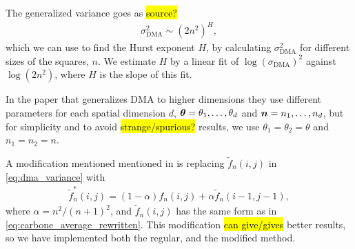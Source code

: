 The generalized variance goes as \hl{source?}
\begin{align*}
    \sigma_\text{DMA}^2 \sim \left(2n^2\right)^H,
\end{align*}
which we can use to find the Hurst exponent $H$, by calculating $\sigma_\text{DMA}^2$ for different sizes of the squares, $n$. We estimate $H$ by a linear fit of $\log \left(\sigma_\text{DMA}\right)^2$ against $\log \left(2n^2 \right)$, where $H$ is the slope of this fit.

In the paper that generalizes DMA to higher dimensions\cite{carbone2007algorithm} they use different parameters for each spatial dimension $d$, $\boldsymbol{\theta} = \theta_1, \dots, \theta_d$ and $\boldsymbol{n} = n_1, \dots, n_d$, but for simplicity and to avoid \hl{strange/spurious?} results, we use $\theta_1 = \theta_2 = \theta$ and $n_1 = n_2 = n$.

A modification mentioned mentioned in \cite{carbone2007algorithm} is replacing $\tilde f_n(i,j)$ in \cref{eq:dma_variance} with
\begin{align*}
    \tilde f_n^*(i,j) = (1-\alpha) f_n(i,j) + \alpha \tilde f_n(i-1,j-1),
\end{align*}
where $\alpha = n^2/(n+1)^2$, and $\tilde f_n(i,j)$ has the same form as in \cref{eq:carbone_average_rewritten}. This modification \hl{can give/gives} better results, so we have  implemented both the regular, and the modified method.






